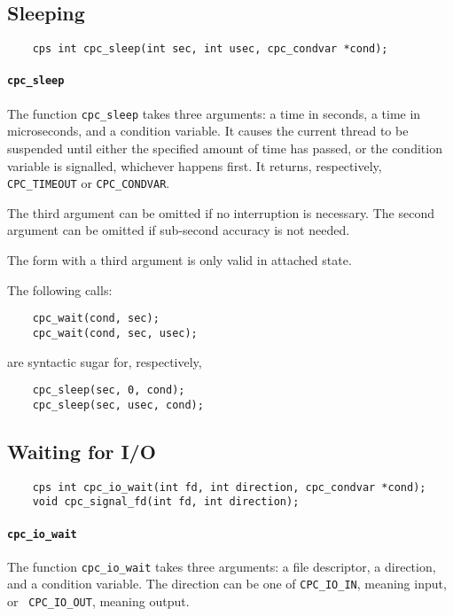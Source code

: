 \documentclass[a4paper]{report}
\begin{document}
\subsection{Sleeping}

\begin{verbatim}
    cps int cpc_sleep(int sec, int usec, cpc_condvar *cond);
\end{verbatim}

\paragraph{\tt cpc\_sleep} The function {\tt cpc\_sleep} takes three
arguments: a time in seconds, a time in microseconds, and a condition
variable.  It causes the current thread to be suspended until
either the specified amount of time has passed, or the condition
variable is signalled, whichever happens first.  It returns,
respectively, {\tt CPC\_TIMEOUT} or {\tt CPC\_CONDVAR}.

The third argument can be omitted if no interruption is necessary.
The second argument can be omitted if sub-second accuracy is not
needed.

The form with a third argument is only valid in attached state.

The following calls:
\begin{verbatim}
    cpc_wait(cond, sec);
    cpc_wait(cond, sec, usec);
\end{verbatim}
are syntactic sugar for, respectively,
\begin{verbatim}
    cpc_sleep(sec, 0, cond);
    cpc_sleep(sec, usec, cond);
\end{verbatim}

\subsection{Waiting for I/O}

\begin{verbatim}
    cps int cpc_io_wait(int fd, int direction, cpc_condvar *cond);
    void cpc_signal_fd(int fd, int direction);
\end{verbatim}

\paragraph{\tt cpc\_io\_wait} The function {\tt cpc\_io\_wait} takes three
arguments: a file descriptor, a direction, and a condition variable.
The direction can be one of {\tt CPC\_IO\_IN}, meaning input, or {\tt
  CPC\_IO\_OUT}, meaning output.
\end{document}

